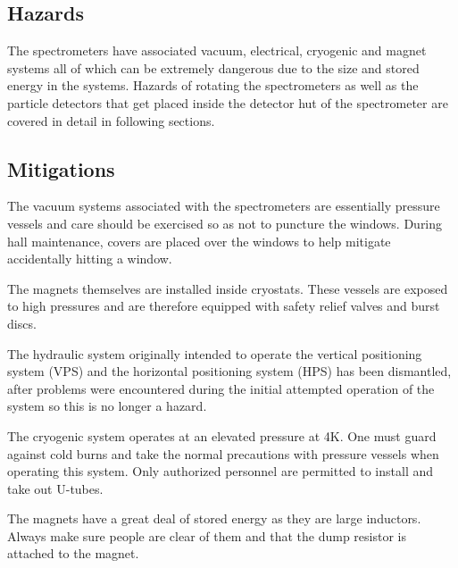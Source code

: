 \begin{safetyen}{0}{0}
\label{sec:hrs-safety}

\subsection{Hazards}

The spectrometers have associated vacuum, electrical, cryogenic and magnet systems all of 
which can be extremely dangerous due to the size and stored energy in the systems. 
Hazards of rotating the spectrometers as well as the particle detectors that get placed
inside the detector hut of the spectrometer are covered in detail in following sections.

\subsection{Mitigations}

The vacuum systems associated with the spectrometers are essentially 
pressure vessels and care should be exercised so as not to puncture the 
windows.   During hall maintenance, covers are placed over the windows
to help mitigate accidentally hitting a window.

The magnets themselves are installed inside cryostats.  These vessels 
are exposed to high pressures and are therefore equipped with safety 
relief valves and burst discs.   

The hydraulic system originally intended to operate the vertical positioning system (VPS) 
and the horizontal positioning system (HPS) has been dismantled, after problems were 
encountered during the initial attempted operation of the system so this is no longer
a hazard.

The cryogenic system operates at an elevated pressure at 4K.  One must 
guard against cold burns and take the normal precautions with pressure 
vessels when operating this system.  Only authorized personnel are permitted to install 
and take out U-tubes.

The magnets have a great deal of stored energy as they are large 
inductors. Always make sure people are clear of them and that
the dump resistor is attached to the magnet.

\end{safetyen}

